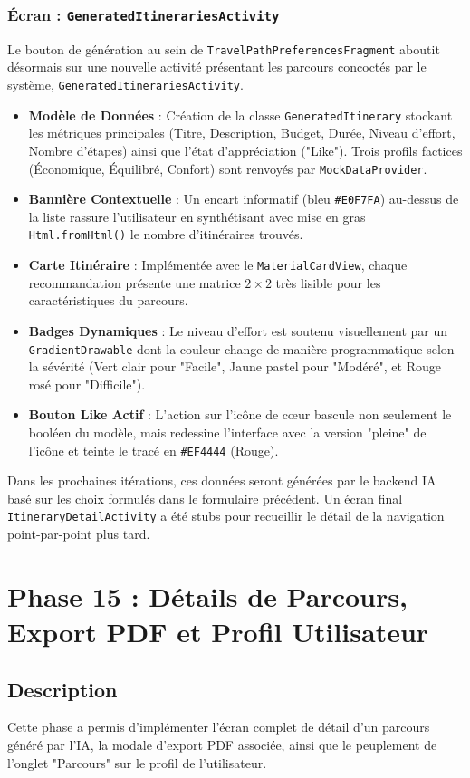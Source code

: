 \documentclass{article}
\begin{document}
\subsubsection{Écran : \texttt{GeneratedItinerariesActivity}}
Le bouton de génération au sein de \texttt{TravelPathPreferencesFragment} aboutit désormais sur une nouvelle activité présentant les parcours concoctés par le système, \texttt{GeneratedItinerariesActivity}.
\begin{itemize}
    \item \textbf{Modèle de Données} : Création de la classe \texttt{GeneratedItinerary} stockant les métriques principales (Titre, Description, Budget, Durée, Niveau d'effort, Nombre d'étapes) ainsi que l'état d'appréciation ("Like"). Trois profils factices (Économique, Équilibré, Confort) sont renvoyés par \texttt{MockDataProvider}.
    \item \textbf{Bannière Contextuelle} : Un encart informatif (bleu \texttt{\#E0F7FA}) au-dessus de la liste rassure l'utilisateur en synthétisant avec mise en gras \texttt{Html.fromHtml()} le nombre d'itinéraires trouvés.
    \item \textbf{Carte Itinéraire} : Implémentée avec le \texttt{MaterialCardView}, chaque recommandation présente une matrice $2 \times 2$ très lisible pour les caractéristiques du parcours.
    \item \textbf{Badges Dynamiques} : Le niveau d'effort est soutenu visuellement par un \texttt{GradientDrawable} dont la couleur change de manière programmatique selon la sévérité (Vert clair pour "Facile", Jaune pastel pour "Modéré", et Rouge rosé pour "Difficile").
    \item \textbf{Bouton Like Actif} : L'action sur l'icône de cœur bascule non seulement le booléen du modèle, mais redessine l'interface avec la version "pleine" de l'icône et teinte le tracé en \texttt{\#EF4444} (Rouge).
\end{itemize}
Dans les prochaines itérations, ces données seront générées par le backend IA basé sur les choix formulés dans le formulaire précédent. Un écran final \texttt{ItineraryDetailActivity} a été stubs pour recueillir le détail de la navigation point-par-point plus tard.

\section{Phase 15 : Détails de Parcours, Export PDF et Profil Utilisateur}
\subsection{Description}
Cette phase a permis d'implémenter l'écran complet de détail d'un parcours généré par l'IA, la modale d'export PDF associée, ainsi que le peuplement de l'onglet "Parcours" sur le profil de l'utilisateur.
\end{document}
